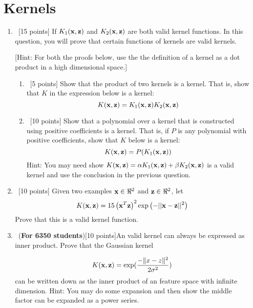 \section{Kernels}
\label{sec:q2}

\begin{enumerate}  


\item  ~[15 points] If $K_1({\bf x},{\bf z})$ and $K_2({\bf x},{\bf z})$ are both valid kernel
  functions. In this question, you will prove that certain functions
  of kernels are valid kernels. 

  [Hint: For both the proofs below, use the the definition of a kernel
  as a dot product in a high dimensional space.]

\begin{enumerate}
\item ~[5 points] Show that the product of two kernels is a kernel.
  That is, show that $K$ in the expression below is a kernel:
  \begin{equation*}
    K({\bf x},{\bf z}) = K_1({\bf x},{\bf z}) K_2({\bf x},{\bf z})
  \end{equation*} 

\item ~[10 points] Show that a polynomial over a kernel that is
  constructed using positive coefficients is a kernel. That is, if $P$
  is any polynomial with positive coefficients, show that $K$ below is
  a kernel:
  \begin{equation*}
    K({\bf x},{\bf z}) =P( K_1({\bf x},{\bf z}))
  \end{equation*} 
Hint: You may need show  $ K({\bf x},{\bf z}) = \alpha K_1({\bf x},{\bf z}) +  \beta K_2({\bf x},{\bf z})$ is a valid kernel and use the conclusion in the previous question.
\end{enumerate} 
  

\item~[10 points] Given two examples ${\bf x} \in \Re^2$ and ${\bf z} \in
  \Re^2$, let
  \begin{equation}
    K({\bf x},{\bf z}) = 15\left({\bf x}^T{\bf z}\right)^2 \exp\left(-||{\bf x} - {\bf z}||^2\right)
  \end{equation}
  Prove that this is a valid kernel function.
  
 \item ~(\textbf{For 6350 students})[10 points]An valid kernel can always be  expressed as inner product. Prove that the Gaussian  kernel

$$K({\bf x}, {\bf z}) = \exp(\frac{-\| x -z\|^2}{2 \sigma^2})$$
 can be written down as the inner product of an feature space with infinite dimension. Hint:  You may do some expansion and  then show the middle factor can be expanded as a power series.
 


\end{enumerate}


